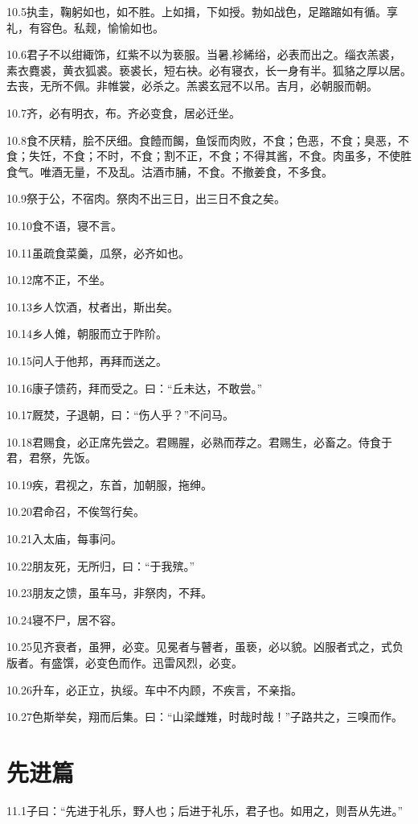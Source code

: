 \documentclass[a4paper,12pt,UTF8,twoside]{ctexbook}
\begin{document}
10.5执圭，鞠躬如也，如不胜。上如揖，下如授。勃如战色，足蹜蹜如有循。享礼，有容色。私觌，愉愉如也。

10.6君子不以绀緅饰，红紫不以为亵服。当暑,袗絺绤，必表而出之。缁衣羔裘，素衣麑裘，黄衣狐裘。亵裘长，短右袂。必有寝衣，长一身有半。狐貉之厚以居。去丧，无所不佩。非帷裳，必杀之。羔裘玄冠不以吊。吉月，必朝服而朝。

10.7齐，必有明衣，布。齐必变食，居必迁坐。

10.8食不厌精，脍不厌细。食饐而餲，鱼馁而肉败，不食；色恶，不食；臭恶，不食；失饪，不食；不时，不食；割不正，不食；不得其酱，不食。肉虽多，不使胜食气。唯酒无量，不及乱。沽酒市脯，不食。不撤姜食，不多食。

10.9祭于公，不宿肉。祭肉不出三日，出三日不食之矣。

10.10食不语，寝不言。

10.11虽疏食菜羹，瓜祭，必齐如也。

10.12席不正，不坐。

10.13乡人饮酒，杖者出，斯出矣。

10.14乡人傩，朝服而立于阼阶。

10.15问人于他邦，再拜而送之。

10.16康子馈药，拜而受之。曰：“丘未达，不敢尝。”

10.17厩焚，子退朝，曰：“伤人乎？”不问马。

10.18君赐食，必正席先尝之。君赐腥，必熟而荐之。君赐生，必畜之。侍食于君，君祭，先饭。

10.19疾，君视之，东首，加朝服，拖绅。

10.20君命召，不俟驾行矣。

10.21入太庙，每事问。

10.22朋友死，无所归，曰：“于我殡。”

10.23朋友之馈，虽车马，非祭肉，不拜。

10.24寝不尸，居不容。

10.25见齐衰者，虽狎，必变。见冕者与瞽者，虽亵，必以貌。凶服者式之，式负版者。有盛馔，必变色而作。迅雷风烈，必变。

10.26升车，必正立，执绥。车中不内顾，不疾言，不亲指。

10.27色斯举矣，翔而后集。曰：“山梁雌雉，时哉时哉！”子路共之，三嗅而作。

\chapter{先进篇}
11.1子曰：“先进于礼乐，野人也；后进于礼乐，君子也。如用之，则吾从先进。”
\end{document}
